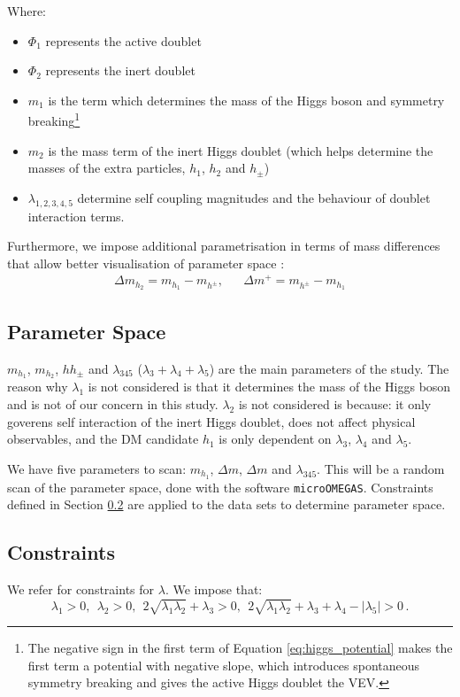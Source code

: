 \documentclass[12pt]{article}
\begin{document}
Where:
\begin{itemize}
    \item $\Phi_1$ represents the active doublet
    \item $\Phi_2$ represents the inert doublet
    \item $m_1$ is the term which determines the mass of the Higgs boson and symmetry breaking\footnote{The negative sign in the first term of Equation \ref{eq:higgs_potential} makes the first term a potential with negative slope, which introduces spontaneous symmetry breaking and gives the active Higgs doublet the VEV.}
    \item $m_2$ is the mass term of the inert Higgs doublet (which helps determine the masses of the extra particles, $h_1$, $h_2$ and $h_\pm$)
    \item $\lambda_{1, 2, 3, 4, 5}$ determine self coupling magnitudes and the behaviour of doublet interaction terms.
\end{itemize}

Furthermore, we impose additional parametrisation in terms of mass differences that allow better visualisation of parameter space \cite{Belyaev_2022}:
\begin{align}
    \Delta m_{h_2} = m_{h_1} - m_{h^\pm},&&\Delta m^+ = m_{h^\pm} - m_{h_1}
\end{align}

\subsection{Parameter Space}
$m_{h_1}$, $m_{h_2}$, $h{h_\pm}$ and $\lambda_{345}$ ($\lambda_3 + \lambda_4 + \lambda_5$) are the main parameters of the study. The reason why $\lambda_1$ is not considered is that it determines the mass of the Higgs boson and is not of our concern in this study. $\lambda_2$ is not considered is because: it only goverens self interaction of the inert Higgs doublet, does not affect physical observables, and the DM candidate $h_1$ is only dependent on $\lambda_3$, $\lambda_4$ and $\lambda_5$.

We have five parameters to scan: $m_{h_1}$, $\Delta m$, $\Delta m$ and $\lambda_{345}$. This will be a random scan of the parameter space, done with the software \verb|microOMEGAS|. Constraints defined in Section \ref{sec:constraints} are applied to the data sets to determine parameter space.

\subsection{Constraints}
\label{sec:constraints}
We refer \cite{Belyaev:2016lok} for constraints for $\lambda$. We impose that:
\begin{equation}
\lambda_1>0,\ \  \lambda_2>0,\ \ 
2\sqrt{\lambda_1\lambda_2}+\lambda_3>0,\ \ 
2\sqrt{\lambda_1\lambda_2}+\lambda_3+\lambda_4 - |\lambda_5|>0\,.
\end{equation}
\end{document}
